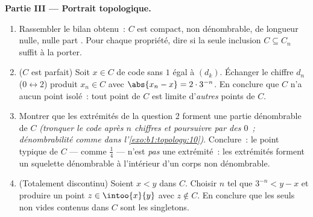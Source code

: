 \begin{problem}[{Devoir maison --- l'\omterm{def:b1:logic:sets}{ensemble} triadique de Cantor~:
longueur nulle, non dénombrable, parfait, et $C + C =
\intcc{0}{2}$}]
\medskip
\noindent\textbf{Partie III --- Portrait topologique.}
\begin{enumerate}[resume]
  \item Rassembler le bilan obtenu~: $C$ est compact, non
        dénombrable, de longueur nulle, nulle part . Pour
        chaque propriété, dire si la seule inclusion $C \subseteq
        C_n$ suffit à la porter.
  \item ($C$ est parfait) Soit $x \in C$ de code sans $1$ égal à
        $(d_k)$. Échanger le chiffre $d_n$ ($0 \leftrightarrow
        2$) produit $x_n \in C$ avec $\abs{x_n - x} = 2 \cdot
        3^{-n}$. En conclure que $C$ n'a aucun point isolé~: tout
        point de $C$ est limite d'\emph{autres} points de $C$.
  \item Montrer que les extrémités de la question 2 forment une
        partie dénombrable  de $C$ \emph{(tronquer le code
        après $n$ chiffres et poursuivre par des $0$~;
        dénombrabilité comme dans l'\cref{exo:b1:topology:10})}.
        Conclure~: le point typique de $C$ --- comme $\frac14$ ---
        n'est \emph{pas} une extrémité~: les extrémités forment un
        squelette dénombrable à l'intérieur d'un corps non
        dénombrable.
  \item (Totalement discontinu) Soient $x < y$ dans $C$. Choisir
        $n$ tel que $3^{-n} < y - x$ et produire un point $z \in
        \intoo{x}{y}$ avec $z \notin C$. En conclure que les
        seuls  non vides contenus dans $C$ sont les
        singletons.
\end{enumerate}


\end{problem}
